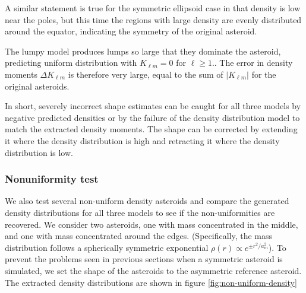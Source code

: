 \documentclass[fleqn,usenatbib]{mnras}
\begin{document}
A similar statement is true for the symmetric ellipsoid case in that density is low near the poles, but this time the regions with large density are evenly distributed around the equator, indicating the symmetry of the original asteroid.

The lumpy model produces lumps so large that they dominate the asteroid, predicting uniform distribution with $K_{\ell m} = 0$ for $\ell \geq 1$.. The error in density moments $\Delta K_{\ell m}$ is therefore very large, equal to the sum of $|K_{\ell m}|$ for the original asteroids.

In short, severely incorrect shape estimates can be caught for all three models by negative predicted densities or by the failure of the density distribution model to match the extracted density moments. The shape can be corrected by extending it where the density distribution is high and retracting it where the density distribution is low.


\subsubsection{Nonuniformity test}
\label{sec:non-uniform-density}

We also test several non-uniform density asteroids and compare the generated density distributions for all three models to see if the non-uniformities are recovered. We consider two asteroids, one with mass concentrated in the middle, and one with mass concentrated around the edges. (Specifically, the mass distribution follows a spherically symmetric exponential $\rho(r) \propto e^{\pm r^2/a_m^2}$). To prevent the problems seen in previous sections when a symmetric asteroid is simulated, we set the shape of the asteroids to the asymmetric reference asteroid. The extracted density distributions are shown in figure \ref{fig:non-uniform-density}
\end{document}
